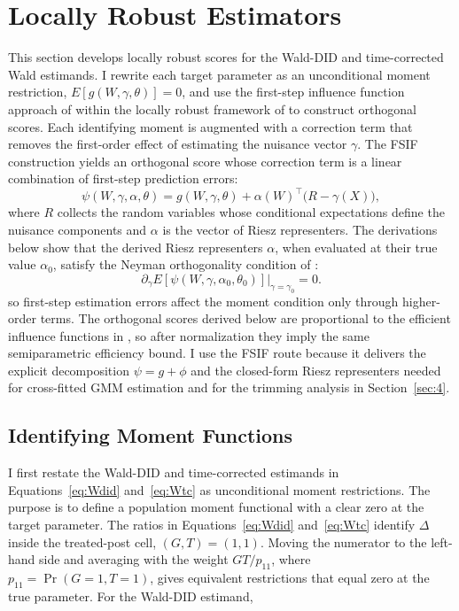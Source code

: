 \section{Locally Robust Estimators}\label{sec:3}

This section develops locally robust scores for the Wald-DID and time-corrected Wald estimands. I rewrite each target parameter as an unconditional moment restriction, $E[g(W,\gamma,\theta)]=0$, and use the first-step influence function approach of \citet{ichimura2022influence} within the locally robust framework of \citet{chernozhukov2022locally} to construct orthogonal scores. Each identifying moment is augmented with a correction term that removes the first-order effect of estimating the nuisance vector $\gamma$. The FSIF construction yields an orthogonal score whose correction term is a linear combination of first-step prediction errors:
\[
\psi(W,\gamma,\alpha,\theta)=g(W,\gamma,\theta)+\alpha(W)^\top\bigl(R-\gamma(X)\bigr),
\]
where $R$ collects the random variables whose conditional expectations define the nuisance components and $\alpha$ is the vector of Riesz representers. The derivations below show that the derived Riesz representers $\alpha$, when evaluated at their true value $\alpha_0$, satisfy the Neyman orthogonality condition of \citet{DDML2018}:
\[
\partial_\gamma E[\psi(W,\gamma,\alpha_0,\theta_0)]\big|_{\gamma=\gamma_0}=0.
\]
so first-step estimation errors affect the moment condition only through higher-order terms. The orthogonal scores derived below are proportional to the efficient influence functions in \citet{fuzzy2018}, so after normalization they imply the same semiparametric efficiency bound. I use the FSIF route because it delivers the explicit decomposition $\psi = g + \phi$ and the closed-form Riesz representers needed for cross-fitted GMM estimation and for the trimming analysis in Section~\ref{sec:4}.


\subsection{Identifying Moment Functions}\label{sec:3a}

I first restate the Wald-DID and time-corrected estimands in Equations~\eqref{eq:Wdid} and~\eqref{eq:Wtc} as unconditional moment restrictions. The purpose is to define a population moment functional with a clear zero at the target parameter. The ratios in Equations~\eqref{eq:Wdid} and~\eqref{eq:Wtc} identify $\Delta$ inside the treated-post cell, $(G,T)=(1,1)$. Moving the numerator to the left-hand side and averaging with the weight $GT/p_{11}$, where $p_{11}=\Pr(G=1,T=1)$, gives equivalent restrictions that equal zero at the true parameter. For the Wald-DID estimand,

